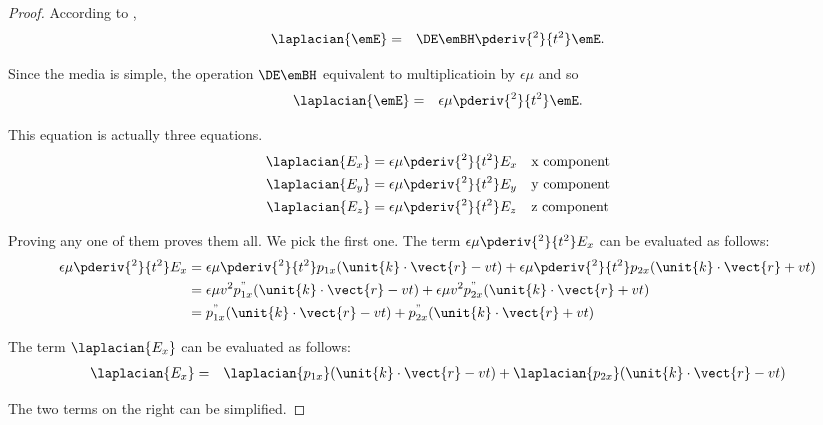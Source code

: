 \begin{proof}
According to ,
\begin{eqnarray}
   \laplacian{\emE} &=& \DE \emBH \pderiv{^2}{t^2}\emE .
\end{eqnarray}

Since the media is simple, the operation $\DE \emBH$ equivalent to multiplicatioin by $\epsilon\mu$ and so
\begin{align*}
   \laplacian{\emE} &=& \epsilon\mu \pderiv{^2}{t^2}\emE.
\end{align*}

This equation is actually three equations.
\begin{align*}
   \laplacian{E_x} &= \epsilon\mu \pderiv{^2}{t^2}E_x  && \text{x component} \\
   \laplacian{E_y} &= \epsilon\mu \pderiv{^2}{t^2}E_y  && \text{y component} \\
   \laplacian{E_z} &= \epsilon\mu \pderiv{^2}{t^2}E_z  && \text{z component}
\end{align*}

Proving any one of them proves them all.  We pick the first one.
The term $\epsilon\mu\pderiv{^2}{t^2}E_x$ can be evaluated as follows:
\begin{align*}
   \epsilon\mu\pderiv{^2}{t^2}E_x
   &= 
   \epsilon\mu\pderiv{^2}{t^2}p_{1x}(\unit{k}\cdot \vect{r} - vt) +
   \epsilon\mu\pderiv{^2}{t^2}p_{2x}(\unit{k}\cdot \vect{r} + vt)
   \\&= 
   \epsilon\mu v^2 p^"_{1x}(\unit{k}\cdot \vect{r} - vt) +
   \epsilon\mu v^2 p^"_{2x}(\unit{k}\cdot \vect{r} + vt)
   \\&= 
   p^"_{1x}(\unit{k}\cdot \vect{r} - vt) +
   p^"_{2x}(\unit{k}\cdot \vect{r} + vt)
\end{align*}

The term $\laplacian{E_x}$ can be evaluated as follows:
\begin{align*}
   \laplacian{E_x}
   &=&
   \laplacian{p_{1x}}(\unit{k}\cdot \vect{r} - vt) +
   \laplacian{p_{2x}}(\unit{k}\cdot \vect{r} - vt)
\end{align*}

The two terms on the right can be simplified.


\end{proof}
